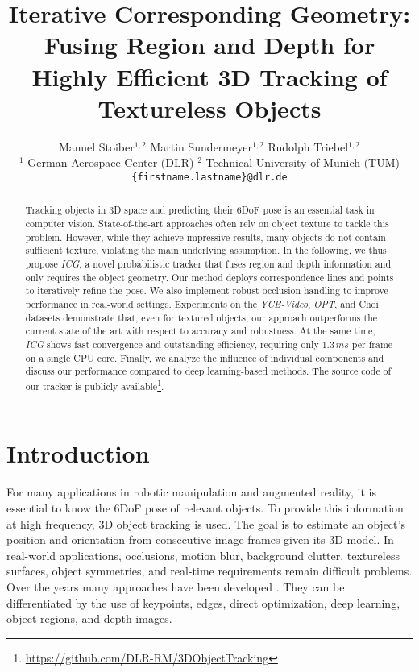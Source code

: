 \documentclass[10pt,twocolumn,letterpaper]{article}
\begin{document}
\title{Iterative Corresponding Geometry: Fusing Region and Depth for\\ Highly Efficient 3D Tracking of Textureless Objects}

\author{Manuel Stoiber$^{1, 2}$ \qquad Martin Sundermeyer$^{1, 2}$ \qquad Rudolph Triebel$^{1, 2}$\\
$^{1}$	German Aerospace Center (DLR) \qquad $^{2}$ Technical University of Munich (TUM)\\
	{\tt\small\{firstname.lastname\}@dlr.de}
}
\maketitle



\begin{abstract}
Tracking objects in 3D space and predicting their \acs{6DoF} pose is an essential task in computer vision.
State-of-the-art approaches often rely on object texture to tackle this problem.
However, while they achieve impressive results, many objects do not contain sufficient texture, violating the main underlying assumption.
In the following, we thus propose \textit{ICG}, a novel probabilistic tracker that fuses region and depth information and only requires the object geometry.
Our method deploys correspondence lines and points to iteratively refine the pose.
We also implement robust occlusion handling to improve performance in real-world settings.
Experiments on the \textit{YCB-Video}, \textit{OPT}, and Choi datasets demonstrate that, even for textured objects, our approach outperforms the current state of the art with respect to accuracy and robustness.
At the same time, \textit{ICG} shows fast convergence and outstanding efficiency, requiring only $1.3\,\unit{ms}$ per frame on a single CPU core.
Finally, we analyze the influence of individual components and discuss our performance compared to deep learning-based methods.
The source code of our tracker is publicly available\footnote{\url{https://github.com/DLR-RM/3DObjectTracking}}.
\end{abstract}
 

\section{Introduction}\label{sec:in}
For many applications in robotic manipulation and augmented reality, it is essential to know the \ac{6DoF} pose of relevant objects.
To provide this information at high frequency, 3D object tracking is used.
The goal is to estimate an object's position and orientation from consecutive image frames given its 3D model.
In real-world applications, occlusions, motion blur, background clutter, textureless surfaces, object symmetries, and real-time requirements remain difficult problems.
Over the years many approaches have been developed \cite{Lepetit2005, Yilmaz2006}.
They can be differentiated by the use of keypoints, edges, direct optimization, deep learning, object regions, and depth images.
\end{document}
